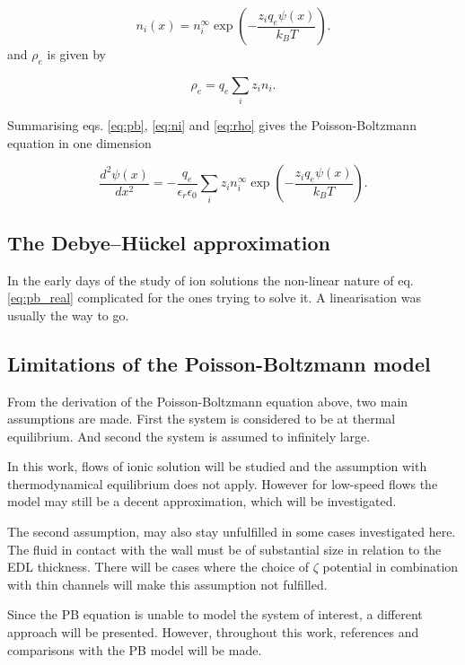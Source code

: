 \begin{equation}\label{eq:ni}
n_i(x) = n_i^{\infty} \exp\left(-\frac{z_i q_e \psi(x)}{k_BT}\right).
\end{equation}
and $\rho_e$ is given by

\begin{equation}\label{eq:rho}
\rho_e = q_e\sum_i z_i n_i.
\end{equation}

Summarising eqs. \eqref{eq:pb}, \eqref{eq:ni} and \eqref{eq:rho} gives
the Poisson-Boltzmann equation in one dimension

\begin{equation}\label{eq:pb_real}
\frac{d^2\psi(x)}{dx^2} = -\frac{q_e}{\epsilon_r \epsilon_0}\sum_i z_i
n_i^{\infty} \exp\left(-\frac{z_i q_e \psi(x)}{k_BT}\right).
\end{equation}

\subsection{The Debye–Hückel approximation}
In the early days of the study of ion solutions the non-linear nature
of eq. \eqref{eq:pb_real} complicated for the ones trying to solve
it. A linearisation was usually the way to go.

\subsection{Limitations of the Poisson-Boltzmann model}
From the derivation of the Poisson-Boltzmann equation above, two main
assumptions are made. First the system is considered to be at thermal
equilibrium. And second the system is assumed to infinitely large. 

In this work, flows of ionic solution will be studied and the
assumption with thermodynamical equilibrium does not apply. However
for low-speed flows the model may still be a decent approximation,
which will be investigated. 

The second assumption, may also stay unfulfilled in some cases
investigated here. The fluid in contact with the wall must be of
substantial size in relation to the EDL thickness. There will be
cases where the choice of $\zeta$ potential in combination with thin
channels will make this assumption not fulfilled.

Since the PB equation is unable to model the system of
interest, a different approach will be presented. However, throughout
this work, references and comparisons with the PB model will be made. 



